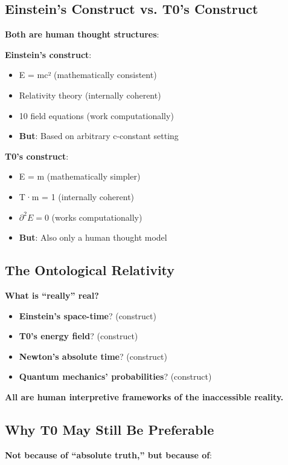 	\subsection{Einstein's Construct vs. T0's Construct}
	
	\textbf{Both are human thought structures}:
	
	\textbf{Einstein's construct}:
	\begin{itemize}
		\item E = mc² (mathematically consistent)
		\item Relativity theory (internally coherent)
		\item 10 field equations (work computationally)
		\item \textbf{But}: Based on arbitrary c-constant setting
	\end{itemize}
	
	\textbf{T0's construct}:
	\begin{itemize}
		\item E = m (mathematically simpler)
		\item T·m = 1 (internally coherent)
		\item $\partial^2 E = 0$ (works computationally)
		\item \textbf{But}: Also only a human thought model
	\end{itemize}
	
	\subsection{The Ontological Relativity}
	
	\textbf{What is ``really'' real?}
	\begin{itemize}
		\item \textbf{Einstein's space-time}? (construct)
		\item \textbf{T0's energy field}? (construct)
		\item \textbf{Newton's absolute time}? (construct)
		\item \textbf{Quantum mechanics' probabilities}? (construct)
	\end{itemize}
	
	\textbf{All are human interpretive frameworks of the inaccessible reality.}
	
	\subsection{Why T0 May Still Be Preferable}
	
	\textbf{Not because of ``absolute truth,'' but because of}:
	
